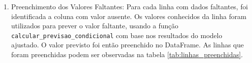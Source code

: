 \begin{enumerate}
\begin{tcolorbox}[colback=white, colframe=black, title=Resposta:]
\begin{enumerate}
        \item Preenchimento dos Valores Faltantes: Para cada linha com dados faltantes, foi identificada a coluna com valor ausente. Os valores conhecidos da linha foram utilizados para prever o valor faltante, usando a função \texttt{calcular\_previsao\_condicional} com base nos resultados do modelo ajustado. O valor previsto foi então preenchido no DataFrame. As linhas que foram preenchidas podem ser observadas na tabela \ref{tab:linhas_preenchidas}.     
    \end{enumerate}
    
\end{tcolorbox}


\end{enumerate}
    
    
